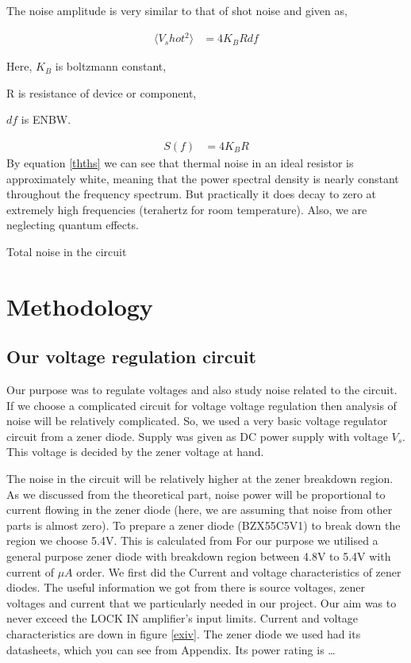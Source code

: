 \documentclass[12pt]{article}
\begin{document}
The noise amplitude is very similar to that of shot noise and given as,

\begin{align}\label{ththvo}
\langle V_shot^2\rangle & = 4 K_B R df
\end{align}

Here, $K_B$ is boltzmann constant,

R is resistance of device or component,

$df$ is ENBW.

\begin{align}\label{thths}
S(f) & = 4 K_B R
\end{align}
By equation \ref{thths} we can see that thermal noise in an ideal resistor is approximately white, meaning that the power spectral density is nearly constant throughout the frequency spectrum. But practically it does decay to zero at extremely high frequencies (terahertz for room temperature). Also, we are neglecting quantum effects. 


Total noise in the circuit



\clearpage
\section{Methodology}\label{methodology}


\subsection{Our voltage regulation circuit}

Our purpose was to regulate voltages and also study noise related to the circuit. If we choose a complicated circuit for voltage voltage regulation then analysis of noise will be relatively complicated. So, we used a very basic voltage regulator circuit from a zener diode. Supply was given as DC power supply with voltage $V_{s}$. This voltage is decided by the zener voltage at hand.

The noise in the circuit will be relatively higher at the zener breakdown region. As we discussed from the theoretical part, noise power will be proportional to current flowing in the zener diode (here, we are assuming that noise from other parts is almost zero). To prepare a zener diode (BZX55C5V1) to break down the region we choose 5.4V. This is calculated from 
For our purpose we utilised a general purpose zener diode with breakdown region between 4.8V to 5.4V with current of $\mu A$ order. We first did the Current and voltage characteristics of zener diodes. The useful information we got from there is source voltages, zener voltages and current that we particularly needed in our project. Our aim was to never exceed the LOCK IN amplifier’s input limits. Current and voltage characteristics are down in figure \ref{exiv}. The zener diode we used had its datasheets, which you can see from Appendix. Its power rating is … 
\end{document}
